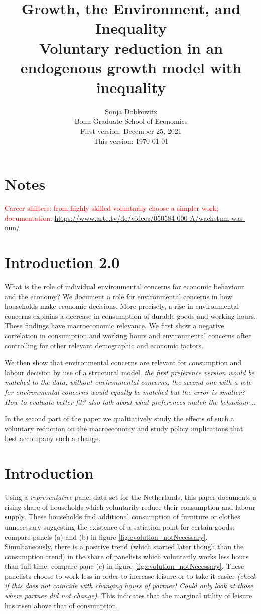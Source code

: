\documentclass[12pt]{article}
\title{Growth, the Environment, and Inequality\\ \small{ Voluntary reduction in an endogenous growth model with inequality}}
\date{Sonja Dobkowitz\\ Bonn Graduate School of Economics\\ %
	\vspace{1mm}
	First version: December 25, 2021\\
	This version: \today }
\newcommand{\tr}[1]{\textcolor{red}{#1}}
\begin{document}
	\maketitle

\section{Notes}
\tr{Career shifters: from highly skilled voluntarily choose a simpler work; documentation: \url{https://www.arte.tv/de/videos/050584-000-A/wachstum-was-nun/} }

\section{Introduction 2.0}
What is the role of individual environmental concerns for economic behaviour and the economy?
We document a role for environmental concerns in how households make economic decisions. 
More precisely, a rise in environmental concerns explains a decrease in consumption of durable goods and working hours. These findings have macroeconomic relevance. 
We first show a negative correlation in consumption and working hours and environmental concerns after controlling for other relevant demographic and economic factors. 

We then show that environmental concerns are relevant for consumption and labour decision by use of a structural model. \textit{the first preference version would be matched to the data, without environmental concerns, the second one with a role for environmental concerns would equally be matched but the error is smaller? How to evaluate better fit? \cite{Bartling2015DoResponsibility} also talk about what preferences match the behaviour...}

In the second part of the paper we qualitatively study the effects of such a voluntary reduction on the macroeconomy and study policy implications that best accompany such a change. 

	
\section{Introduction}

Using a \textit{representative} panel data set for the Netherlands, this paper documents a rising share of households which voluntarily reduce their consumption and labour supply. These households find additional consumption of furniture or clothes unnecessary suggesting the existence of a satiation point for certain goods; compare panels (a) and (b) in figure \ref{fig:evolution_notNecessary}. Simultaneously, there is a positive trend (which started later though than the consumption trend) in the share of panelists which voluntarily works less hours than full time; compare pane (c) in figure \ref{fig:evolution_notNecessary}. These panelists choose to work less in order to increase leisure or to take it easier \textit{(check if this does not coincide with changing hours of partner! Could only look at those where partner did not change)}. This indicates that the marginal utility of leisure  has risen above that of consumption. 
\end{document}
